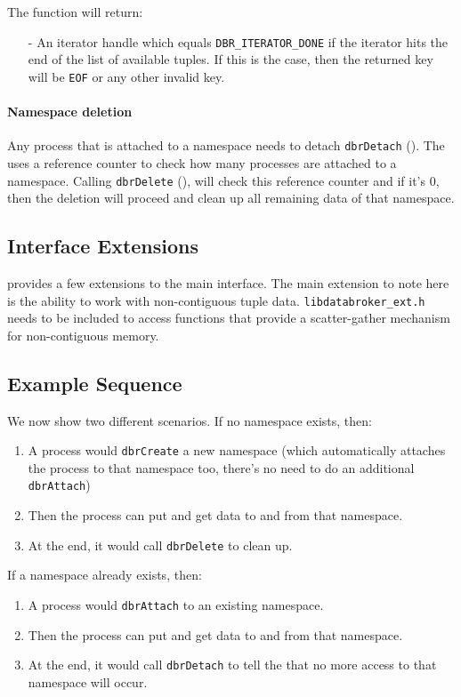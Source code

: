 The function will return:
\begin{itemize}
\item [-] An iterator handle which equals \texttt{DBR\_ITERATOR\_DONE}
  if the iterator hits the end of the list of available tuples. If
  this is the case, then the returned key will be \texttt{EOF} or any
  other invalid key.
\end{itemize}


\paragraph{Namespace deletion} Any process that is attached to a
namespace needs to detach \texttt{dbrDetach}
(). The \databroker uses a
reference counter to check how many processes are attached to a
namespace.  Calling \texttt{dbrDelete} (), will check this reference counter
and if it's 0, then the deletion will proceed and clean up all
remaining data of that namespace.



\subsection{Interface Extensions}
\databroker provides a few extensions to the main interface. The main
extension to note here is the ability to work with non-contiguous
tuple data.  \texttt{libdatabroker\_ext.h} needs to be included to
access functions that provide a scatter-gather mechanism for
non-contiguous memory.


\subsection{Example Sequence}
\label{sec:interface:example}
We now show two different scenarios.
If no namespace exists, then:
\begin{enumerate}
\item A process would \texttt{dbrCreate} a new namespace (which
  automatically attaches the process to that namespace too, there's no
  need to do an additional \texttt{dbrAttach})
\item Then the process can put and get data to and from that namespace.
\item At the end, it would call \texttt{dbrDelete} to clean up.
\end{enumerate}

\noindent If a namespace already exists, then:
\begin{enumerate}
\item A process would \texttt{dbrAttach} to an existing namespace.
\item Then the process can put and get data to and from that namespace.
\item At the end, it would call \texttt{dbrDetach} to tell the \databroker
  that no more access to that namespace will occur.
\end{enumerate}

